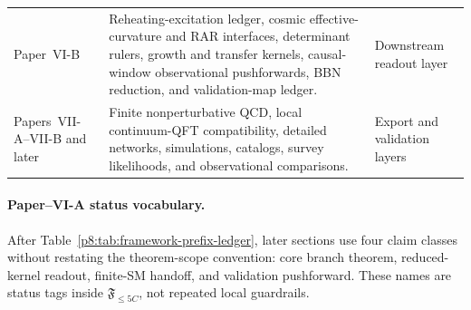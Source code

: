 \documentclass[12pt,a4paper]{article}
\begin{document}
\begin{table}[H]
\begin{tabularx}{\textwidth}{@{}p{}X p{}@{}}
Paper~VI-B & Reheating-excitation ledger, cosmic effective-curvature and RAR interfaces, determinant rulers, growth and transfer kernels, causal-window observational pushforwards, BBN reduction, and validation-map ledger. & Downstream readout layer \\
Papers~VII-A--VII-B and later & Finite nonperturbative QCD, local continuum-QFT compatibility, detailed networks, simulations, catalogs, survey likelihoods, and observational comparisons. & Export and validation layers \\
\bottomrule
\end{tabularx}
\end{table}

\paragraph{Paper--VI-A status vocabulary.}
After Table~\ref{p8:tab:framework-prefix-ledger}, later sections use four claim classes without restating the theorem-scope convention: core branch theorem, reduced-kernel readout, finite-SM handoff, and validation pushforward.  These names are status tags inside \(\mathfrak F_{\le5C}\), not repeated local guardrails.
\end{document}
